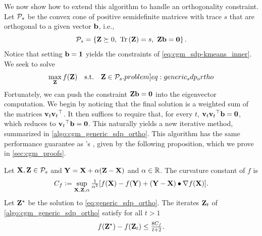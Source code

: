 \documentclass[twoside,11pt]{article}
\begin{document}
We now show how to extend this algorithm to handle an orthogonality constraint.
Let ${\mathcal{P}}_s$ be the convex cone of positive semidefinite matrices with trace $s$ that are orthogonal to a given vector ${\mathbf{b}}$, i.e.,
\begin{equation}
	{\mathcal{P}}_s = \left\{ {\mathbf{Z}} \succeq 0 ,\ \operatorname{Tr}\left({\mathbf{Z}}\right) = s ,\ {\mathbf{Z}} {\mathbf{b}} = {\mathbf{0}} \right\} .
    \label{eq:Ps_set}
\end{equation}
Notice that setting ${\mathbf{b}} = {\mathbf{1}}$ yields the constraints of \cref{eq:cgm_sdp-kmeans_inner}.
We seek to solve
\begin{equation}
	\max_{\mat{Z}}
    f(\mat{Z})
	\quad\text{s.t.}\quad
    \mat{Z} \in \set{P}_s .
	\label[problem]{eq:generic_sdp_ortho}
\end{equation}
Fortunately, we can push the constraint ${\mathbf{Z}} {\mathbf{b}} = {\mathbf{0}}$ into the eigenvector computation. We begin by noticing that the final solution is a weighted sum of the matrices ${\mathbf{v}}_{t} {{\mathbf{v}}_{t}}^\top$. It then suffices to require that, for every $t$, ${\mathbf{v}}_{t} {{\mathbf{v}}_{t}}^\top {\mathbf{b}} = {\mathbf{0}}$, which reduces to ${{\mathbf{v}}_{t}}^\top {\mathbf{b}} = {\mathbf{0}}$.
This naturally yields a new iterative method, summarized in \cref{algo:cgm_generic_sdp_ortho}.
This algorithm has the same performance guarantee as \citeauthor{Hazan2008sdp}'s \citeyearpar{Hazan2008sdp}, given by the following proposition, which we prove in \cref{sec:cgm_proofs}.
\begin{proposition}
 	Let ${\mathbf{X}}, {\mathbf{Z}} \in {\mathcal{P}}_s$ and ${\mathbf{Y}} = {\mathbf{X}} + \alpha ({\mathbf{Z}} - {\mathbf{X}})$ and $\alpha \in {\mathbb R}$.
    The curvature constant of $f$ is
	\begin{equation}
	C_f \vcentcolon=
    \sup_{{\mathbf{X}}, {\mathbf{Z}}, \alpha}
    \tfrac{1}{\alpha^2}
        [ f({\mathbf{X}}) - f({\mathbf{Y}}) + ({\mathbf{Y}} - {\mathbf{X}}) \bullet \nabla f({\mathbf{X}}) ] .
        \label{eq:curvature_constant}
	\end{equation}
	Let ${\mathbf{Z}}^{\star}$ be the solution to \cref{eq:generic_sdp_ortho}.
	The iterates ${\mathbf{Z}}_t$ of \cref{algo:cgm_generic_sdp_ortho} satisfy for all $t > 1$
    \begin{equation}
    	f({\mathbf{Z}}^{\star}) - f({\mathbf{Z}}_t) \leq  \tfrac{8 C_f}{t+2} .
    \end{equation}
	\label{theo:accuracy}
\end{proposition}
\end{document}
